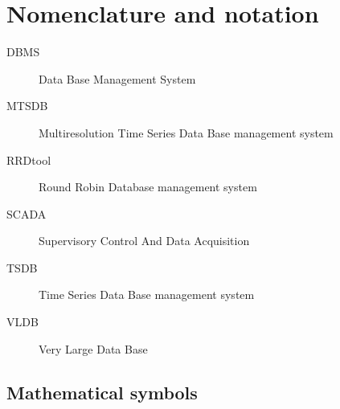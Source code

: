 \section{Nomenclature and notation}

\begin{description}
\item[DBMS] Data Base Management System
\item[MTSDB] Multiresolution Time Series Data Base management system
\item[RRDtool] Round Robin Database management system \parencite{rrdtool}
\item[SCADA] Supervisory Control And Data Acquisition
\item[TSDB] Time Series Data Base management system
\item[VLDB] Very Large Data Base 
\end{description}

\subsection{Mathematical symbols}




